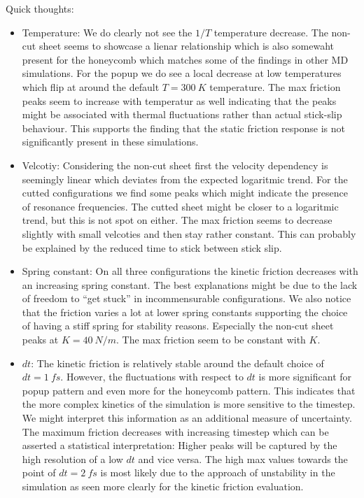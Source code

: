 Quick thoughts:
\begin{itemize}
  \item Temperature: We do clearly not see the $1/T$ temperature decrease. The non-cut sheet seems to showcase a lienar relationship which is also somewaht present for the honeycomb which matches some of the findings in other MD simulations. For the popup we do see a local decrease at low temperatures which flip at around the default $T = \SI{300}{K}$ temperature. The max friction peaks seem to increase with temperatur as well indicating that the peaks might be associated with thermal fluctuations rather than actual stick-slip behaviour. This supports the finding that the static friction response is not significantly present in these simulations. 
  \item Velcotiy: Considering the non-cut sheet first the velocity dependency is seemingly linear which deviates from the expected logaritmic trend. For the cutted configurations we find some peaks which might indicate the presence of resonance frequencies. The cutted sheet might be closer to a logaritmic trend, but this is not spot on either. The max friction seems to decrease slightly with small velcoties and then stay rather constant. This can probably be explained by the reduced time to stick between stick slip. 
  \item Spring constant: On all three configurations the kinetic friction decreases with an increasing spring constant. The best explanations might be due to the lack of freedom to ``get stuck'' in incommensurable configurations. We also notice that the friction varies a lot at lower spring constants supporting the choice of having a stiff spring for stability reasons. Especially the non-cut sheet peaks at $K = \SI{40}{N/m}$. The max friction seem to be constant with $K$.
  \item $dt$: The kinetic friction is relatively stable around the default choice of $dt = \SI{1}{fs}$. However, the fluctuations with respect to $dt$ is more significant for popup pattern and even more for the honeycomb pattern. This indicates that the more complex kinetics of the simulation is more sensitive to the timestep. We might interpret this information as an additional measure of uncertainty. The maximum friction decreases with increasing timestep which can be asserted a statistical interpretation: Higher peaks will be captured by the high resolution of a low $dt$ and vice versa. The high max values towards the point of $dt = \SI{2}{fs}$ is most likely due to the approach of unstability in the simulation as seen more clearly for the kinetic friction evaluation. 
\end{itemize}


